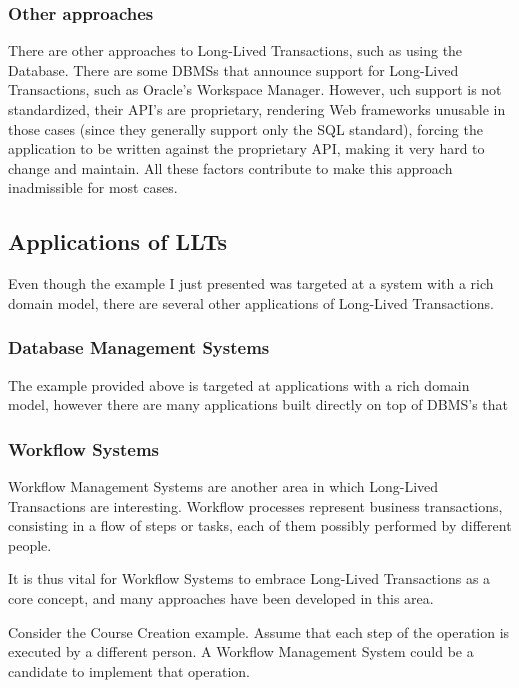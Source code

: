 \documentclass{llncs}
\begin{document}
\subsubsection{Other approaches}

There are other approaches to Long-Lived Transactions, such as using
the Database. There are some DBMSs that announce support for
Long-Lived Transactions, such as Oracle's Workspace Manager. However,
uch support is not standardized, their API's are proprietary,
rendering Web frameworks unusable in those cases (since they generally
support only the SQL standard), forcing the application to be written
against the proprietary API, making it very hard to change and
maintain. All these factors contribute to make this approach
inadmissible for most cases.

\subsection{Applications of LLTs}

Even though the example I just presented was targeted at a system with
a rich domain model, there are several other applications of
Long-Lived Transactions.

\subsubsection{Database Management Systems}

The example provided above is targeted at applications with a rich
domain model, however there are many applications built directly on
top of DBMS's that

\subsubsection{Workflow Systems}

Workflow Management Systems are another area in which Long-Lived
Transactions are interesting. Workflow processes represent business
transactions, consisting in a flow of steps or tasks, each of them
possibly performed by different people.

It is thus vital for Workflow Systems to embrace Long-Lived
Transactions as a core concept, and many approaches have been
developed in this area.

Consider the Course Creation example. Assume that each step of the
operation is executed by a different person. A Workflow Management
System could be a candidate to implement that operation.
\end{document}
